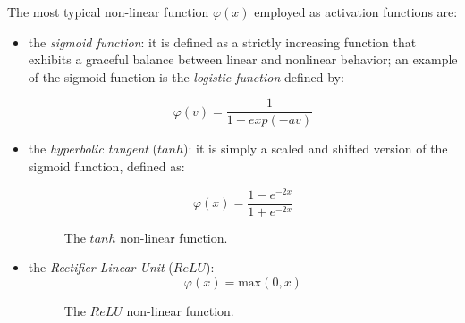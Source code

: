 
The most typical non-linear function $\varphi(x)$ employed as activation functions are:
\begin{itemize}
\item the \textit{sigmoid function}: it is defined as a strictly increasing function that exhibits a graceful balance between linear and nonlinear behavior; an example of the sigmoid function is the \textit{logistic function} defined by:

\begin{equation}
\varphi \left( v \right) =\frac { 1 }{ 1+exp\left( -av \right)  } 
\end{equation}

\item the \textit{ hyperbolic tangent } ($tanh$): it is simply a scaled and shifted version of the sigmoid function, defined as:

\begin{equation}
\varphi(x) = \frac{1-e^{-2x}}{1+e^{-2x}}
\end{equation}


\begin{figure}[h]
	\centering
	\resizebox{0.4\textwidth}{!}{
	}
\caption{The $tanh$ non-linear function.}
\end{figure}


\item the \textit{ Rectifier Linear Unit} ($ReLU$):
\begin{equation}
\varphi(x) = \text{max}(0,x)
\end{equation}
\begin{figure}[h!]
	\centering
	\resizebox{0.4\textwidth}{!}{
	}
	\caption{The $ReLU$ non-linear function.}
\end{figure}


\end{itemize}
